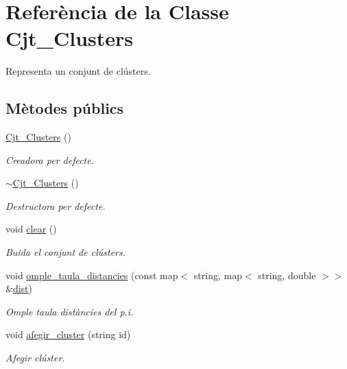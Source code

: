 \hypertarget{class_cjt___clusters}{}\section{Referència de la Classe Cjt\+\_\+\+Clusters}
\label{class_cjt___clusters}


Representa un conjunt de clústers.  


\subsection*{Mètodes públics}
\begin{DoxyCompactItemize}
\item 
\hyperlink{class_cjt___clusters_a2e55759944a78043744103e19dd87c1c}{Cjt\+\_\+\+Clusters} ()
\begin{DoxyCompactList}\small\item\em Creadora per defecte. \end{DoxyCompactList}\item 
\hyperlink{class_cjt___clusters_a71b7feadb377225edecc0b980a8c18d6}{$\sim$\+Cjt\+\_\+\+Clusters} ()
\begin{DoxyCompactList}\small\item\em Destructora per defecte. \end{DoxyCompactList}\item 
void \hyperlink{class_cjt___clusters_a7bbb88f22b1ec3a53302f646813c4602}{clear} ()
\begin{DoxyCompactList}\small\item\em Buida el conjunt de clústers. \end{DoxyCompactList}\item 
void \hyperlink{class_cjt___clusters_af1bf97b420bf3933bfe2ba9904e01241}{omple\+\_\+taula\+\_\+distancies} (const map$<$ string, map$<$ string, double $>$$>$ \&\hyperlink{class_cjt___clusters_afde449634787205786301b40e053fe91}{dist})
\begin{DoxyCompactList}\small\item\em Omple taula distàncies del p.\+i. \end{DoxyCompactList}\item 
void \hyperlink{class_cjt___clusters_a195166b0ac52530dadc9c883c206a01c}{afegir\+\_\+cluster} (string id)
\begin{DoxyCompactList}\small\item\em Afegir clúster. \end{DoxyCompactList}\item 
$$
\end{DoxyCompactItemize}
